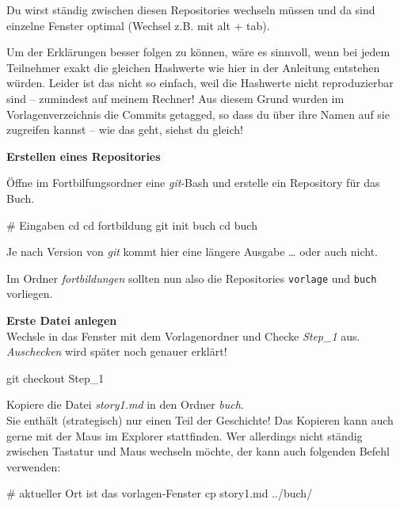 \documentclass[
  letterpaper,
  DIV=11]{scrreprt}
\newenvironment{Shaded}{\begin{snugshade}}{\end{snugshade}}
\newcommand{\BuiltInTok}[1]{\textcolor[rgb]{0.00,0.23,0.31}{#1}}
\newcommand{\CommentTok}[1]{\textcolor[rgb]{0.37,0.37,0.37}{#1}}
\newcommand{\FunctionTok}[1]{\textcolor[rgb]{0.28,0.35,0.67}{#1}}
\newcommand{\NormalTok}[1]{\textcolor[rgb]{0.00,0.23,0.31}{#1}}
\newcommand{\git}{\textit{git}\xspace}
\newcommand{\alt}[1]{alt + #1\xspace}
\newcommand{\datei}[1]{\textit{#1}\xspace}
\begin{document}
Du wirst ständig zwischen diesen Repositories wechseln müssen und da
sind einzelne Fenster optimal (Wechsel z.B. mit \alt{tab}).

\samplestart

Um der Erklärungen besser folgen zu können, wäre es sinnvoll, wenn bei
jedem Teilnehmer exakt die gleichen Hashwerte wie hier in der Anleitung
entstehen würden. Leider ist das nicht so einfach, weil die Hashwerte
nicht reproduzierbar sind -- zumindest auf meinem Rechner! Aus diesem
Grund wurden im Vorlagenverzeichnis die Commits getagged, so dass du
über ihre Namen auf sie zugreifen kannst -- wie das geht, siehst du
gleich! \sampleend

\textbf{Erstellen eines Repositories}

Öffne im Fortbilfungsordner eine \git-Bash und erstelle ein Repository
für das Buch.

\begin{Shaded}
\begin{Highlighting}[]
\CommentTok{\# Eingaben}
\BuiltInTok{cd} 
\BuiltInTok{cd}\NormalTok{ fortbildung}
\FunctionTok{git}\NormalTok{ init buch }
\BuiltInTok{cd}\NormalTok{ buch }
\end{Highlighting}
\end{Shaded}

Je nach Version von \git kommt hier eine längere Ausgabe \ldots{} oder
auch nicht.

Im Ordner \emph{fortbildungen} sollten nun also die Repositories
\texttt{vorlage} und \texttt{buch} vorliegen.

\textbf{Erste Datei anlegen}\\
Wechsle in das Fenster mit dem Vorlagenordner und Checke \emph{Step\_1}
aus. \emph{Auschecken} wird später noch genauer erklärt!

\begin{Shaded}
\begin{Highlighting}[]
\FunctionTok{git}\NormalTok{ checkout Step\_1}
\end{Highlighting}
\end{Shaded}

Kopiere die Datei \datei{story1.md} in den Ordner \emph{buch}.\\
Sie enthält (strategisch) nur einen Teil der Geschichte! Das Kopieren
kann auch gerne mit der Maus im Explorer stattfinden. Wer allerdings
nicht ständig zwischen Tastatur und Maus wechseln möchte, der kann auch
folgenden Befehl verwenden:

\begin{Shaded}
\begin{Highlighting}[]
\CommentTok{\# aktueller Ort ist das vorlagen{-}Fenster}
\FunctionTok{cp}\NormalTok{ story1.md  ../buch/ }
\end{Highlighting}
\end{Shaded}
\end{document}
